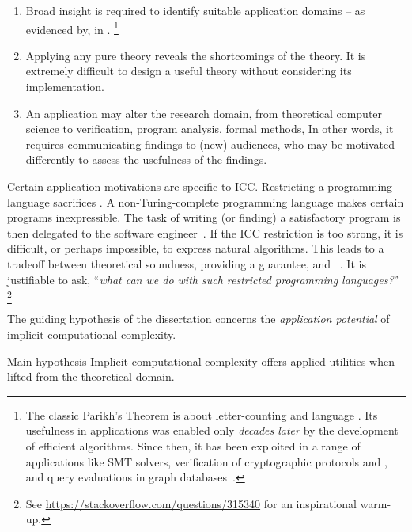 \begin{enumerate}

\item Broad insight is required to identify suitable application domains -- as
      evidenced by, \eg {} in .%
      \footnote{The classic Parikh's Theorem is about letter-counting and language .
      Its usefulness in applications was enabled only \emph{decades later} by the development of efficient algorithms.
      Since then,  it has been exploited in a range of applications like SMT solvers, verification of cryptographic protocols and , and query evaluations in graph databases~\cite[pg. 2]{hague2024}.}

\item Applying any pure theory reveals the shortcomings of the theory.
      It is extremely difficult to design a useful theory without considering its implementation.

\item An application may alter the research domain, \eg from theoretical computer science to verification, program analysis, formal methods, \etc
      In other words, it requires communicating findings to (new) audiences, who may be motivated differently to assess the usefulness of the findings.

\end{enumerate}

Certain application motivations are specific to ICC\@.
Restricting a programming language sacrifices .
A non-Turing-complete programming language makes certain programs inexpressible.
The task of writing (or finding) a satisfactory program is then delegated to the software engineer~\cite[p. 14]{moyen2017}.
If the ICC restriction is too strong, it is difficult, or perhaps impossible, to express natural algorithms.
This leads to a tradeoff between theoretical soundness, \ie providing a guarantee, and ~\cite{feree2018}.
It is justifiable to ask, \enquote{\emph{what can we do with such restricted programming languages?}}%
\footnote{See \url{https://stackoverflow.com/questions/315340} for an inspirational warm-up.}

The guiding hypothesis of the dissertation concerns the \emph{application
potential} of implicit computational complexity.
\begin{infobox}[]{Main hypothesis}
Implicit computational complexity offers applied utilities when lifted from the
theoretical domain.
\end{infobox}

